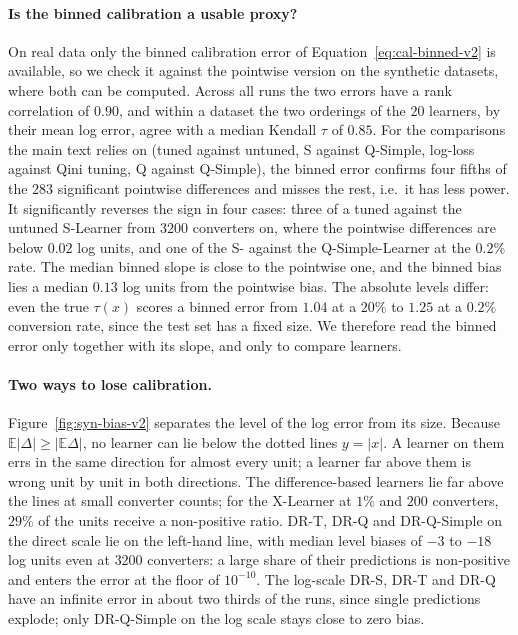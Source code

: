 \documentclass{article}
\begin{document}
\paragraph{Is the binned calibration a usable proxy?}
On real data only the binned calibration error of Equation~\eqref{eq:cal-binned-v2}
is available, so we check it against the pointwise version on the synthetic
datasets, where both can be computed. Across all runs the two errors have a
rank correlation of $0.90$, and within a dataset the two orderings of the
$20$ learners, by their mean log error, agree with a median Kendall $\tau$
of $0.85$. For the comparisons the main text relies on (tuned against
untuned, S against Q-Simple, log-loss against Qini tuning, Q against
Q-Simple), the binned error confirms four fifths of the $283$ significant
pointwise differences and misses the rest, i.e.\ it has less power. It
significantly reverses the sign in four cases: three of a tuned against the
untuned S-Learner from $3200$ converters on, where the pointwise differences
are below $0.02$ log units, and one of the S- against the Q-Simple-Learner
at the $0.2\%$ rate. The median binned slope is close to the pointwise one,
and the binned bias lies a median $0.13$ log units from the pointwise bias.
The absolute levels differ: even the true
$\tau(x)$ scores a binned error from $1.04$ at a $20\%$ to $1.25$ at a $0.2\%$
conversion rate, since the test set has a fixed size. We therefore read the
binned error only together with its slope, and only to compare learners.

\paragraph{Two ways to lose calibration.}
Figure~\ref{fig:syn-bias-v2} separates the level of the log error from its
size. Because $\mathbb{E}|\Delta| \ge |\mathbb{E}\Delta|$, no learner can lie
below the dotted lines $y = |x|$. A learner on them errs in the same
direction for almost every unit; a learner far above them is wrong unit by
unit in both directions. The difference-based learners lie far above the
lines at small converter counts; for the X-Learner at $1\%$ and $200$
converters, $29\%$ of the units receive a non-positive ratio. DR-T, DR-Q and
DR-Q-Simple on the direct scale lie on the left-hand line, with median level
biases of $-3$ to $-18$ log units even at $3200$ converters: a large share of their predictions is non-positive and
enters the error at the floor of $10^{-10}$. The log-scale DR-S, DR-T and
DR-Q have an infinite error in about two thirds of the runs, since single
predictions explode; only DR-Q-Simple on the log scale stays close to zero
bias.
\end{document}
